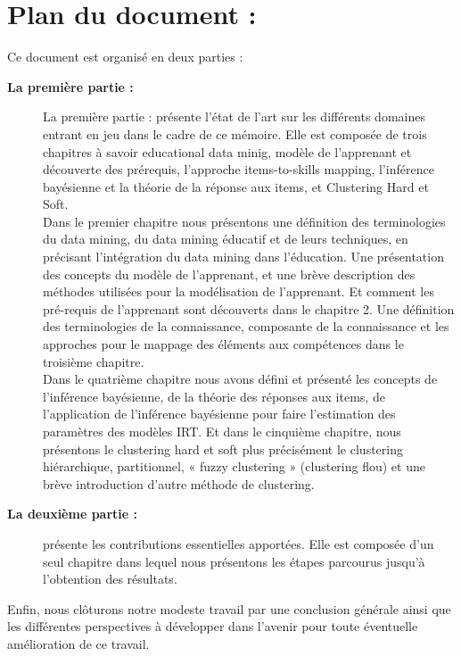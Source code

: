\newpage

\section*{Plan du document : }

Ce document est organisé en deux parties :

\begin{description}
    \item[\textbf{La première partie :}] La première partie : présente l’état de l’art sur les différents domaines entrant en jeu dans le cadre de ce mémoire. Elle est composée de trois chapitres à savoir educational data minig, modèle de l’apprenant et découverte des prérequis, l’approche items-to-skills mapping, l’inférence bayésienne et la théorie de la réponse aux items, et Clustering Hard et Soft. \\
    Dans le premier chapitre nous présentons une définition des terminologies du data mining, du data mining éducatif et de leurs techniques, en précisant l'intégration du data mining dans l'éducation. Une présentation des concepts du modèle de l'apprenant, et une brève description des méthodes utilisées pour la modélisation de l'apprenant. Et comment les pré-requis de l'apprenant sont découverts dans le chapitre 2. Une définition des terminologies de la connaissance, composante de la connaissance et les approches pour le mappage des éléments aux compétences dans le troisième chapitre. \\
    Dans le quatrième chapitre nous avons défini et présenté les concepts de l’inférence bayésienne, de la théorie des réponses aux items, de l’application de l’inférence bayésienne pour faire l’estimation des paramètres des modèles IRT. Et dans le cinquième chapitre, nous présentons le clustering hard et soft plus précisément le clustering hiérarchique, partitionnel, « fuzzy clustering » (clustering flou) et une brève introduction d’autre méthode de clustering.     
    
    \item[\textbf{La deuxième partie : }]présente les contributions essentielles apportées. Elle est composée d’un seul chapitre dans lequel nous présentons les étapes parcourus jusqu’à l’obtention des résultats.   
\end{description}

Enfin, nous clôturons notre modeste travail par une conclusion générale ainsi que les différentes perspectives à développer dans l’avenir pour toute éventuelle amélioration de ce travail.
